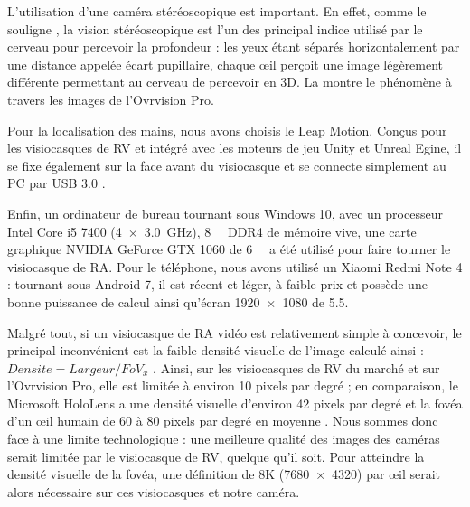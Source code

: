 L'utilisation d'une caméra stéréoscopique est important. En effet, comme le souligne \cite{Bourke1999}, la vision stéréoscopique est l'un des principal indice utilisé par le cerveau pour percevoir la profondeur : les yeux étant séparés horizontalement par une distance appelée écart pupillaire, chaque \oe il perçoit une image légèrement différente permettant au cerveau de percevoir en 3D. La  montre le phénomène à travers les images de l'Ovrvision Pro.

Pour la localisation des mains, nous avons choisis le Leap Motion. Conçus pour les visiocasques de RV et intégré avec les moteurs de jeu Unity et Unreal Egine, il se fixe également sur la face avant du visiocasque et se connecte simplement au PC par USB 3.0 .

Enfin, un ordinateur de bureau tournant sous Windows 10, avec un processeur Intel Core i5 7400 (\SI[product-units = single]{4x3.0}{\GHz}), \SI{8}{\giga\byte} DDR4 de mémoire vive, une carte graphique NVIDIA GeForce GTX 1060 de \SI{6}{\giga\byte} a été utilisé pour faire tourner le visiocasque de RA. Pour le téléphone, nous avons utilisé un Xiaomi Redmi Note 4 : tournant sous Android 7, il est récent et léger, à faible prix et possède une bonne puissance de calcul ainsi qu'écran \SI{1920x1080}{\px} de \SI{5.5}{\inch}.

Malgré tout, si un visiocasque de RA vidéo est relativement simple à concevoir, le principal inconvénient est la faible densité visuelle de l'image calculé ainsi : $Densite = Largeur / FoV_x$ \citep{Boger2017}. Ainsi, sur les visiocasques de RV du marché et sur l'Ovrvision Pro, elle est limitée à environ 10 pixels par degré  ; en comparaison, le Microsoft HoloLens a une densité visuelle d'environ 42 pixels par degré et la fovéa d'un \oe il humain de 60 à 80 pixels par degré en moyenne \citep{Kistner2014}. Nous sommes donc face à une limite technologique : une meilleure qualité des images des caméras serait limitée par le visiocasque de RV, quelque qu'il soit. Pour atteindre la densité visuelle de la fovéa, une définition de 8K (\SI{7680x4320}{\px}) par \oe il serait alors nécessaire sur ces visiocasques et notre caméra.

